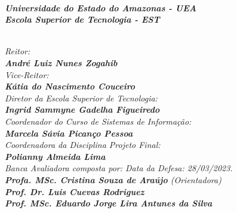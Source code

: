 \begin{spacing}{1.4}
\textit{\textbf{\\
Universidade do Estado do Amazonas - UEA\\
Escola Superior de Tecnologia - EST}}

\textit{\\
Reitor:\\
\textbf{André Luiz Nunes Zogahib}\\
Vice-Reitor:\\
\textbf{Kátia do Nascimento Couceiro}}
\\
\textit{
Diretor da Escola Superior de Tecnologia:\\
\textbf{Ingrid Sammyne Gadelha Figueiredo}}
\\
\textit{
Coordenador do Curso de Sistemas de Informação:\\
\textbf{Marcela Sávia Picanço Pessoa}}
\\
\textit{
Coordenadora da Disciplina Projeto Final:\\
\textbf{Polianny Almeida Lima}}
\\[12pt]
\textit{
Banca Avaliadora composta por: \hfill Data da Defesa: 28/03/2023.\\
}
\textit{
\textbf{Profa.  MSc. Cristina Souza de Araújo} (Orientadora)\\
\textbf{Prof. Dr. Luis Cuevas Rodriguez}\\%
\textbf{Prof. MSc. Eduardo Jorge Lira Antunes da Silva}
}
\ \ \\
 \begin{small}
\begin{center}
\end{center}
\end{small}
\end{spacing}
 \newpage
